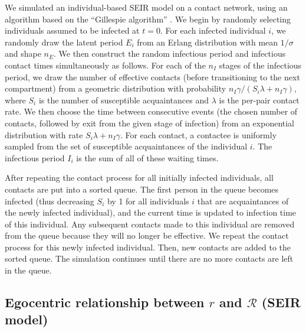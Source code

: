 \documentclass[12pt]{article}
\newcommand{\RR}{\ensuremath{{\mathcal R}}}
\begin{document}
We simulated an individual-based SEIR model on a contact network, using an algorithm based on the ``Gillespie algorithm'' \cite{bartlett1953stochastic,gillespie1977exact}.
We begin by randomly selecting individuals assumed to be infected at $t = 0$.
For each infected individual $i$, we randomly draw the latent period $E_i$ from an Erlang distribution with mean $1/\sigma$ and shape $n_E$.
We then construct the random infectious period and infectious contact times simultaneously as follows.
For each of the $n_I$ stages of the infectious period, we draw the number of effective contacts (before transitioning to the next compartment) from a geometric distribution with probability $n_I\gamma/(S_i \lambda + n_I \gamma)$, where $S_i$ is the number of susceptible acquaintances and $\lambda$ is the per-pair contact rate.
We then choose the time between consecutive events (the chosen number of contacts, followed by exit from the given stage of infection) from an exponential distribution with rate $S_i \lambda + n_I\gamma$.
For each contact, a contactee is uniformly sampled from the set of susceptible acquaintances of the individual $i$.
The infectious period $I_i$ is the sum of all of these waiting times.

After repeating the contact process for all initially infected individuals, all contacts are put into a sorted queue.
The first person in the queue becomes infected (thus decreasing $S_i$ by 1 for all individuals $i$ that are acquaintances of the newly infected individual), and the current time is updated to infection time of this individual. 
Any subsequent contacts made to this individual are removed from the queue because they will no longer be effective.
We repeat the contact process for this newly infected individual.
Then, new contacts are added to the sorted queue.
The simulation continues until there are no more contacts are left in the queue.

\subsection{Egocentric relationship between $r$ and $\RR$ (SEIR model)}
\label{egosection}
\end{document}
